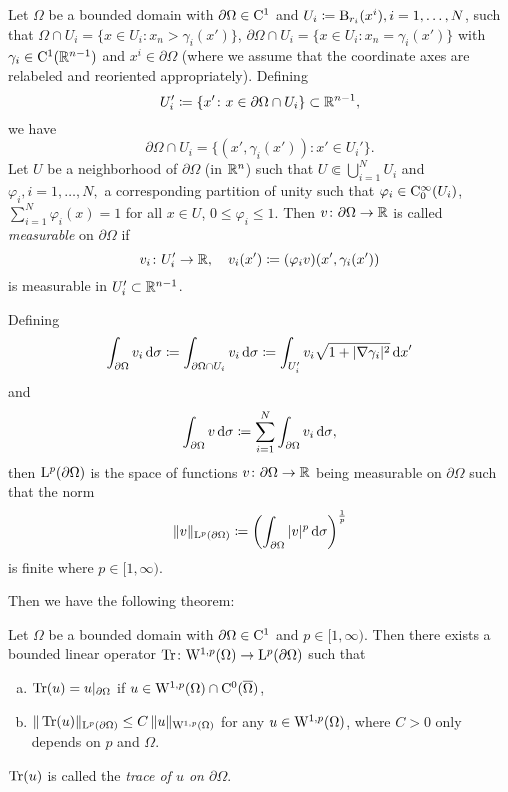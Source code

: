 \begin{defn}
  \label{defn:boundarySpace}
  Let $\Omega$ be a bounded domain with $\partial\Omega \in \mathrm{C}^1$ and 
  $U_i \coloneqq \mathrm{B}_{r_i}(x^i), i = 1,\dots,N$, such that 
  $\Omega \cap U_i = \{x \in U_i \colon x_n > \gamma_i(x') \}$, 
  $\partial \Omega \cap U_i = \{x \in U_i \colon x_n = \gamma_i(x') \}$ 
  with $\gamma_i \in \mathrm{C}^1(\mathbb{R}^{n - 1})$ and $x^i \in \partial\Omega$ (where we assume that the coordinate axes are relabeled and reoriented appropriately).
  Defining
  $$
  U_i' \coloneqq \{ x' \colon x \in \partial\Omega \cap U_i \} \subset \mathbb{R}^{n - 1},
  $$
  we have 
  $$
  \partial\Omega \cap U_i = \{ (x', \gamma_i(x')) \colon x' \in U_i' \}.
  $$
  Let $U$ be a neighborhood of $\partial\Omega$ (in $\mathbb{R}^n$) such that $U \Subset \bigcup_{i = 1}^N U_i$ and $\varphi_i, i = 1,\dots,N,$ a corresponding partition of unity such that $\varphi_i \in \mathrm{C}_0^\infty(U_i)$, $\sum_{i = 1}^N \varphi_i(x) = 1$ for all $x \in U$, $0 \leq \varphi_i \leq 1$.
  Then $v \colon \partial\Omega \to \mathbb{R}$ is called \emph{measurable} on $\partial\Omega$ if 
  $$
  v_i \colon U_i' \to \mathbb{R}, \quad v_i(x') \coloneqq (\varphi_i v)(x', \gamma_i(x'))
  $$
  is measurable in $U_i' \subset \mathbb{R}^{n - 1}$.

  Defining
  $$
  \int_{\partial\Omega} v_i \, {\operatorname{d}\!{\sigma}}
  \coloneqq \int_{\partial\Omega \cap U_i} v_i \, {\operatorname{d}\!{\sigma}}
  \coloneqq \int_{U_i'} v_i \sqrt{1 + |\nabla\gamma_i|^2} \, {\operatorname{d}\!{x}}'
  $$
  and
  $$
  \int_{\partial \Omega} v \, {\operatorname{d}\!{\sigma}} \coloneqq \sum_{i = 1}^N \int_{\partial \Omega} v_i \, {\operatorname{d}\!{\sigma}},
  $$
  then $\mathrm{L}^p(\partial\Omega)$ is the space of functions $v \colon \partial\Omega \to \mathbb{R}$ being measurable on $\partial\Omega$ such that the norm
  $$
  \| v\|_{\mathrm{L}^p(\partial \Omega)} \coloneqq \left( \int_{\partial\Omega} |v|^p \, {\operatorname{d}\!{\sigma}} \right)^{\frac{1}{p}}
  $$
  is finite where $p \in [1,\infty)$.
\end{defn}

Then we have the following theorem:

\begin{thm}
  \label{thm:trace}
  Let $\Omega$ be a bounded domain with $\partial\Omega \in \mathrm{C}^1$ and $p \in [1,\infty)$.
    Then there exists a bounded linear operator $\operatorname{Tr} \colon \mathrm{W}^{1,p}(\Omega) \to \mathrm{L}^p(\partial\Omega)$ such that
    \begin{enumerate}[a)]
      \item $\operatorname{Tr}(u) = u|_{\partial\Omega}$ if $u \in \mathrm{W}^{1,p}(\Omega) \cap \mathrm{C}^0(\overline\Omega)$,
      \item $\|\operatorname{Tr}(u)\|_{\mathrm{L}^p(\partial\Omega)} \leq C \, \|u\|_{\mathrm{W}^{1,p}(\Omega)}$ for any $u \in \mathrm{W}^{1,p}(\Omega)$, where $C > 0$ only depends on $p$ and $\Omega$.
    \end{enumerate}
    $\operatorname{Tr}(u)$ is called the \emph{trace of $u$ on $\partial\Omega$}.
\end{thm}

